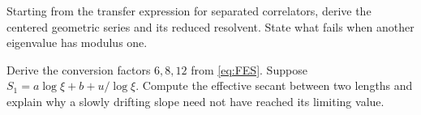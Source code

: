 \begin{exercise}\label{ex:MPS-resolvent}
Starting from the transfer expression for separated correlators,
derive the centered geometric series and its reduced resolvent.
State what fails when another eigenvalue has modulus one.

\par\smallskip{}\par
\end{exercise}
\begin{exercise}\label{ex:MPS-scaling}
Derive the conversion factors $6,8,12$ from \eqref{eq:FES}.
Suppose $S_1=a\log\xi+b+u/\log\xi$. Compute the effective secant
between two lengths and explain why a slowly drifting slope need
not have reached its limiting value.

\par\smallskip{}\par
\end{exercise}
